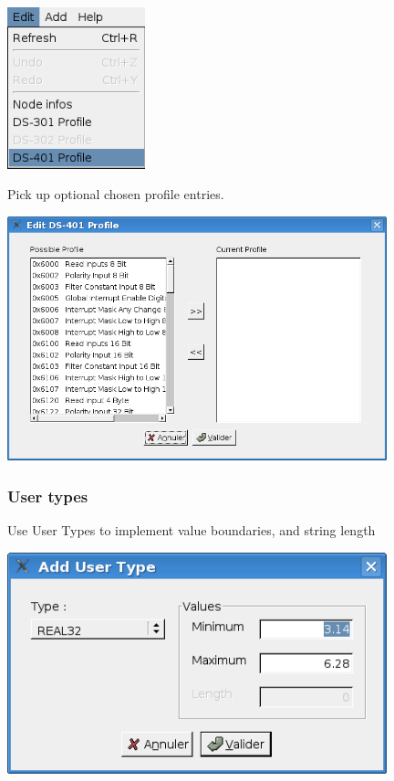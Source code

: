 \documentclass[12pt,english,a4paper]{book}
\begin{document}
\begin{center}
\includegraphics[width=4cm]{Pictures/10000000000000AB000000C88F594413} 
\par\end{center}

Pick up optional chosen profile entries.

\begin{center}
\includegraphics[width=11cm]{Pictures/10000201000002DE000001D82D89C224} 
\par\end{center}


\subsubsection{User types}

Use User Types to implement value boundaries, and string length

\begin{center}
\includegraphics[width=11cm]{Pictures/10000201000001C40000010766961D7F} 
\par\end{center}
\end{document}
